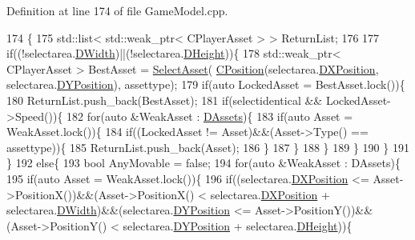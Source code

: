 Definition at line 174 of file Game\+Model.\+cpp.


\begin{DoxyCode}
174                                                                                                            
                                   \{
175     std::list< std::weak\_ptr< CPlayerAsset > > ReturnList;
176     
177     \textcolor{keywordflow}{if}((!selectarea.\hyperlink{structSRectangle_a4150898b3f7d90f6e4b0d44bf1ae3bd2}{DWidth})||(!selectarea.\hyperlink{structSRectangle_a84ea3c2314c43cab6186170662188899}{DHeight}))\{
178         std::weak\_ptr< CPlayerAsset > BestAsset = \hyperlink{classCPlayerData_a1c926b101513f871ec85e34ac3c83ec4}{SelectAsset}(
      \hyperlink{classCPosition}{CPosition}(selectarea.\hyperlink{structSRectangle_abcbddb03b3ee416cc33109833b5f075c}{DXPosition}, selectarea.\hyperlink{structSRectangle_a120aa0a90033bc6e07c36c151a3bbc71}{DYPosition}), assettype);
179         \textcolor{keywordflow}{if}(\textcolor{keyword}{auto} LockedAsset = BestAsset.lock())\{
180             ReturnList.push\_back(BestAsset);
181             \textcolor{keywordflow}{if}(selectidentical && LockedAsset->Speed())\{
182                 \textcolor{keywordflow}{for}(\textcolor{keyword}{auto} &WeakAsset : \hyperlink{classCPlayerData_a1d7dd355facf52db6242e3554373906c}{DAssets})\{
183                     \textcolor{keywordflow}{if}(\textcolor{keyword}{auto} Asset = WeakAsset.lock())\{
184                         \textcolor{keywordflow}{if}((LockedAsset != Asset)&&(Asset->Type() == assettype))\{
185                             ReturnList.push\_back(Asset);   
186                         \}
187                     \}
188                 \}
189             \}
190         \}
191     \}
192     \textcolor{keywordflow}{else}\{
193         \textcolor{keywordtype}{bool} AnyMovable = \textcolor{keyword}{false};
194         \textcolor{keywordflow}{for}(\textcolor{keyword}{auto} &WeakAsset : DAssets)\{
195             \textcolor{keywordflow}{if}(\textcolor{keyword}{auto} Asset = WeakAsset.lock())\{
196                 \textcolor{keywordflow}{if}((selectarea.\hyperlink{structSRectangle_abcbddb03b3ee416cc33109833b5f075c}{DXPosition} <= Asset->PositionX())&&(Asset->PositionX() < 
      selectarea.\hyperlink{structSRectangle_abcbddb03b3ee416cc33109833b5f075c}{DXPosition} + selectarea.\hyperlink{structSRectangle_a4150898b3f7d90f6e4b0d44bf1ae3bd2}{DWidth})&&(selectarea.\hyperlink{structSRectangle_a120aa0a90033bc6e07c36c151a3bbc71}{DYPosition} <= Asset->PositionY())&&
      (Asset->PositionY() < selectarea.\hyperlink{structSRectangle_a120aa0a90033bc6e07c36c151a3bbc71}{DYPosition} + selectarea.\hyperlink{structSRectangle_a84ea3c2314c43cab6186170662188899}{DHeight}))\{

\end{DoxyCode}
